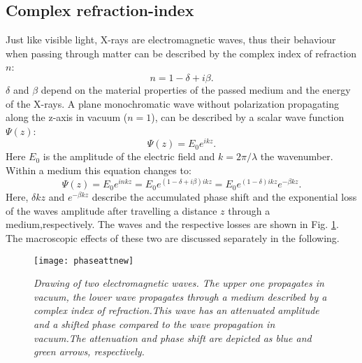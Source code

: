 \subsection{Complex refraction-index}\label{subsec:cri}
Just like visible light, X-rays are electromagnetic waves, thus their behaviour when passing through matter can be described by the complex index of refraction $n$:\citep{Als-nielsen}
\begin{equation}
n = 1 -\delta + i \beta .
\end{equation}
$\delta$ and $\beta$ depend on the material properties of the passed medium and the energy of the X-rays. 
A plane monochromatic wave without polarization propagating along the z-axis in vacuum ($n=1$), can be described by a scalar wave function $\Psi(z)$:
\begin{equation}
\Psi(z) = E_{0} e^{ikz}. \label{pw} 
\end{equation}
Here $E_{0}$ is the amplitude of the electric field and $k = 2\pi /\lambda$ the wavenumber. Within a medium this equation changes to:
\begin{equation}
\Psi(z) = E_{0} e^{inkz} = E_{0} e^{(1-\delta + i\beta)ikz} = E_{0} e^{(1-\delta)ikz} e^{-\beta kz}.\label{medium} 
\end{equation}
Here,  $\delta kz$ and $e^{-\beta kz}$ describe the accumulated phase shift and the exponential loss of the waves amplitude after travelling a distance $z$ through a medium,respectively. The waves and the respective losses are shown in Fig. \ref{phatt}. The macroscopic effects of these two are discussed separately in the following.   
\begin{figure}[t]
	\begin{center}
		\texttt{[image: phaseattnew]}
	\end{center}
	\caption[Attenuation and phase shift of electromagnetic waves]{\textit{Drawing of two electromagnetic waves. The upper one propagates in vacuum, the lower wave propagates through a medium described by a complex index of refraction.This wave has an attenuated amplitude and a shifted phase compared to the wave propagation in vacuum.The attenuation and phase shift are depicted as blue and green arrows, respectively.}}
	\label{phatt}
\end{figure}
